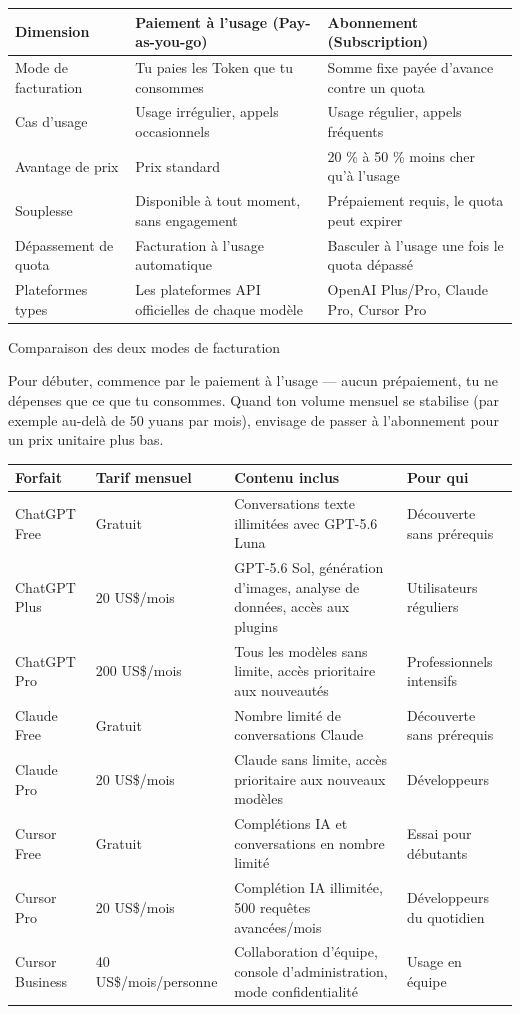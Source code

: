 
\begin{center}
\begin{tabularx}{\linewidth}{|X|X|X|}
\hline
\textbf{Dimension} & \textbf{Paiement à l'usage (Pay-as-you-go)} & \textbf{Abonnement (Subscription)} \tabularnewline
\hline
Mode de facturation & Tu paies les Token que tu consommes & Somme fixe payée d'avance contre un quota \tabularnewline
Cas d'usage & Usage irrégulier, appels occasionnels & Usage régulier, appels fréquents \tabularnewline
Avantage de prix & Prix standard & 20 \% à 50 \% moins cher qu'à l'usage \tabularnewline
Souplesse & Disponible à tout moment, sans engagement & Prépaiement requis, le quota peut expirer \tabularnewline
Dépassement de quota & Facturation à l'usage automatique & Basculer à l'usage une fois le quota dépassé \tabularnewline
Plateformes types & Les plateformes API officielles de chaque modèle & OpenAI Plus/Pro, Claude Pro, Cursor Pro \tabularnewline
\hline
\end{tabularx}
\end{center}

\begin{center}\small\color{gray}Comparaison des deux modes de facturation\end{center}

Pour débuter, commence par le paiement à l'usage — aucun prépaiement, tu ne dépenses que ce que tu consommes. Quand ton volume mensuel se stabilise (par exemple au-delà de 50 yuans par mois), envisage de passer à l'abonnement pour un prix unitaire plus bas.


\begin{center}
\begin{tabularx}{\linewidth}{|X|X|X|X|}
\hline
\textbf{Forfait} & \textbf{Tarif mensuel} & \textbf{Contenu inclus} & \textbf{Pour qui} \tabularnewline
\hline
ChatGPT Free & Gratuit & Conversations texte illimitées avec GPT-5.6 Luna & Découverte sans prérequis \tabularnewline
ChatGPT Plus & 20 US\$/mois & GPT-5.6 Sol, génération d'images, analyse de données, accès aux plugins & Utilisateurs réguliers \tabularnewline
ChatGPT Pro & 200 US\$/mois & Tous les modèles sans limite, accès prioritaire aux nouveautés & Professionnels intensifs \tabularnewline
Claude Free & Gratuit & Nombre limité de conversations Claude & Découverte sans prérequis \tabularnewline
Claude Pro & 20 US\$/mois & Claude sans limite, accès prioritaire aux nouveaux modèles & Développeurs \tabularnewline
Cursor Free & Gratuit & Complétions IA et conversations en nombre limité & Essai pour débutants \tabularnewline
Cursor Pro & 20 US\$/mois & Complétion IA illimitée, 500 requêtes avancées/mois & Développeurs du quotidien \tabularnewline
Cursor Business & 40 US\$/mois/personne & Collaboration d'équipe, console d'administration, mode confidentialité & Usage en équipe \tabularnewline
\hline
\end{tabularx}
\end{center}

